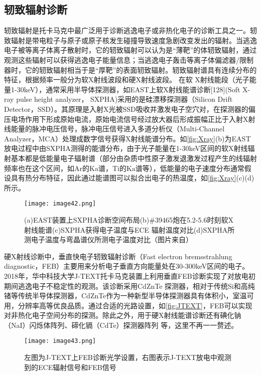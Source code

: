 \subsection{轫致辐射诊断}
轫致辐射是托卡马克中最广泛用于诊断逃逸电子或非热化电子的诊断工具之一。轫致辐射是带电粒子与原子或原子核发生碰撞导致速度急剧改变发出的辐射。当逃逸电子被等离子体离子散射时，它的轫致辐射可以认为是“薄靶”的体轫致辐射，通过观测这些辐射可以获得逃逸电子能量信息；当逃逸电子轰击等离子体偏滤器/限制器时，它的轫致辐射相当于是“厚靶”的表面轫致辐射\cite{RN1744}。轫致辐射谱具有连续分布的特征，根据频率一般分为软X射线波段和硬X射线波段。
在软 X射线能段（光子能量1-30keV），通常采用半导体探测器，如EAST上软X射线能谱诊断[128](Soft X-ray pulse height analyzer， SXPHA)采用的是硅漂移探测器（Silicon Drift Detector，SSD）。其原理是入射X光被SSD吸收并激发电子空穴对，在探测器的偏压电场作用下形成原始电流，原始电流信号经过放大器后形成振幅正比于入射X射线能量的脉冲电压信号，脉冲电压信号进入多道分析仪（Multi-Channel Analyzer，MCA）处理成数字信号获得X射线能谱分布。如\autoref{fig:Xray}(b)为EAST放电过程中由SXPHA测得的能谱分布，由于光子能量在1-30keV区间的软X射线辐射基本都是低能量电子辐射谱（部分由杂质中性原子激发退激发过程产生的线辐射频率也在这个区间，如Ar的Ka谱，Ti的Ka谱等），低能量的电子速度分布通常假设具有热分布特征，因此通过能谱图可以拟合出电子的热温度，如\autoref{fig:Xray}(c)(d)所示。
\begin{figure}[ht]
\centering
\texttt{[image: image42.png]}
\caption{\label{fig:Xray}(a)EAST装置上SXPHA诊断空间布局(b)\#39465炮在5.2-5.6时刻软X射线能谱(c)SXPHA获得电子温度与ECE 辐射温度对比(d)SXPHA所测电子温度与弯晶谱仪所测电子温度对比（图片来自\cite{RN1491}）}
\end{figure}\par
  硬X射线诊断中，垂直快电子轫致辐射诊断\cite{RN6}（Fast electron bremsstrahlung diagnostic，FEB）主要用来分析电子垂直方向能量处在30-300keV区间的电子。2018年，华中科技大学J-TEXT托卡马克装置上利用垂直FEB诊断实现了对放电初期间逃逸电子不稳定性的观测\cite{RN6}。该诊断采用CdZnTe 探测器，相对于传统Si和高纯锗等传统半导体探测器，CdZnTe作为一种新型半导体探测器具有体积小，室温可用，分辨率高等优良品质。通过合适的光路设置，如\autoref{fig:JTEXT}，FEB可以实现对非热化电子空间分布的探测。除此之外，用于硬X射线能谱诊断还有碘化钠（NaI）闪烁体阵列\cite{RN956}、碲化镉（CdTe）探测器阵列\cite{RN957}	等，这里不再一一赘述。  
\begin{figure}[ht]
\centering
\texttt{[image: image43.png]}
\caption{\label{fig:JTEXT}左图为J-TEXT上FEB诊断光学设置，右图表示J-TEXT放电中观测到的ECE辐射信号和FEB信号\cite{RN6}}
\end{figure}
